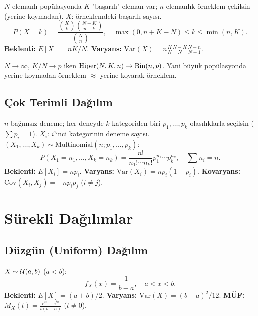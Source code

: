 \begin{tanim}
\label{def:hipergeometrik}
$N$ elemanlı popülasyonda $K$ "başarılı" eleman var; $n$ elemanlık örneklem çekilsin
(yerine koymadan). $X$: örneklemdeki başarılı sayısı.
\[
  P(X = k) = \frac{\binom{K}{k}\binom{N-K}{n-k}}{\binom{N}{n}},
  \quad \max(0, n+K-N) \leq k \leq \min(n, K).
\]
\textbf{Beklenti:} $E[X] = nK/N$. \quad
\textbf{Varyans:} $\mathrm{Var}(X) = n \frac{K}{N}\frac{N-K}{N}\frac{N-n}{N-1}$.
\end{tanim}

\begin{onerme}
$N \to \infty$, $K/N \to p$ iken $\mathrm{Hiper}(N, K, n) \to \operatorname{Bin}(n, p)$.
Yani büyük popülasyonda yerine koymadan örneklem $\approx$ yerine koyarak örneklem.
\end{onerme}

\subsection{Çok Terimli Dağılım}
\label{subsec:multinomial}

\begin{tanim}
\label{def:multinomial}
$n$ bağımsız deneme; her deneyde $k$ kategoriden biri $p_1, \ldots, p_k$ olasılıklarla seçilsin
($\sum p_i = 1$). $X_i$: $i$'inci kategorinin deneme sayısı.
$(X_1, \ldots, X_k) \sim \mathrm{Multinomial}(n; p_1, \ldots, p_k)$:
\[
  P(X_1 = n_1, \ldots, X_k = n_k) = \frac{n!}{n_1! \cdots n_k!} p_1^{n_1} \cdots p_k^{n_k},
  \quad \sum n_i = n.
\]
\textbf{Beklenti:} $E[X_i] = np_i$. \quad
\textbf{Varyans:} $\mathrm{Var}(X_i) = np_i(1-p_i)$. \quad
\textbf{Kovaryans:} $\mathrm{Cov}(X_i, X_j) = -np_i p_j$ ($i \neq j$).
\end{tanim}

\section{Sürekli Dağılımlar}
\label{sec:surekli_dagilimlar}

\subsection{Düzgün (Uniform) Dağılım}
\label{subsec:uniform}

\begin{tanim}
\label{def:uniform}
$X \sim \mathcal{U}(a, b)$ ($a < b$):
\[
  f_X(x) = \frac{1}{b-a}, \quad a < x < b.
\]
\textbf{Beklenti:} $E[X] = (a+b)/2$. \quad
\textbf{Varyans:} $\mathrm{Var}(X) = (b-a)^2/12$. \quad
\textbf{MÜF:} $M_X(t) = \frac{e^{tb}-e^{ta}}{t(b-a)}$ ($t \neq 0$).
\end{tanim}

